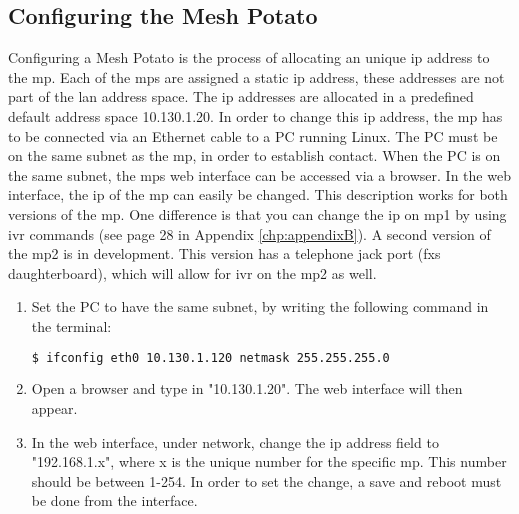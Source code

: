 \subsection{Configuring the Mesh Potato}
\label{subsec:configuring}
Configuring a Mesh Potato is the process of allocating an unique \gls{ip} address to the \gls{mp}. Each of the \glspl{mp} are assigned a static \gls{ip} address, these addresses are not part of the \gls{lan} address space. The \gls{ip} addresses are allocated in a predefined default address space 10.130.1.20. In order to change this \gls{ip} address, the \gls{mp} has to be connected via an Ethernet cable to a PC running Linux. The PC must be on the same subnet as the \gls{mp}, in order to establish contact. When the PC is on the same subnet, the \glspl{mp} web interface can be accessed via a browser. In the web interface, the \gls{ip} of the \gls{mp} can easily be changed. This description works for both versions of the \gls{mp}. One difference is that you can change the \gls{ip} on \gls{mp1} by using \gls{ivr} commands (see page 28 in Appendix \ref{chp:appendixB}). A second version of the \gls{mp2} is in development. This version has a telephone jack port (\gls{fxs} daughterboard), which will allow for \gls{ivr} on the \gls{mp2} as well. 

\begin{enumerate}
\item Set the PC to have the same subnet, by writing the following command in the terminal:
\noindent
\begin{lstlisting}[language=bash]
  $ ifconfig eth0 10.130.1.120 netmask 255.255.255.0
\end{lstlisting}
\item Open a browser and type in "10.130.1.20". The web interface will then appear. 
\item In the web interface, under network, change the \gls{ip} address field to "192.168.1.x", where x is the unique number for the specific \gls{mp}. This number should be between 1-254. In order to set the change, a save and reboot must be done from the interface. 
\end{enumerate}

